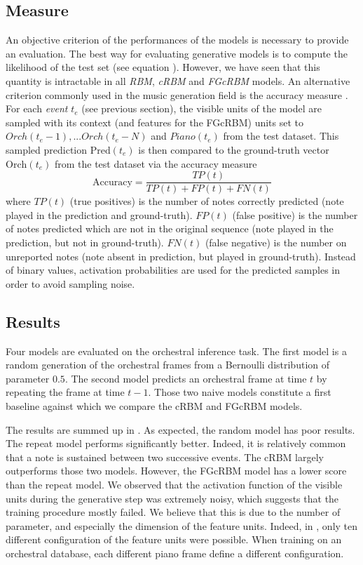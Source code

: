 \documentclass{article}
\begin{document}
\subsection{Measure}
An objective criterion of the performances of the models is necessary to provide an evaluation. 
The best way for evaluating generative models is to compute the likelihood of the test set (see equation ). However, we have seen that this quantity is intractable in all \textit{RBM}, \textit{cRBM} and \textit{FGcRBM} models. 
An alternative criterion commonly used in the music generation field is the accuracy measure \cite{DBLP:journals/corr/YaoCVDD15,boulanger2012modeling,lavrenko2003polyphonic}. For each \textit{event} $t_{e}$ (see previous section), the visible units of the model are sampled with its context (and features for the FGcRBM) units set to $Orch(t_{e}-1),... Orch(t_{e}-N)$ and $Piano(t_{e})$ from the test dataset. This sampled prediction $\text{Pred}(t_{e})$ is then compared to the ground-truth vector $\text{Orch}(t_{e})$ from the test dataset via the accuracy measure
\begin{equation}
\text{Accuracy}  = \frac{TP(t)}{TP(t) + FP(t) + FN(t)}
\label{eq:accuracy}
\end{equation}
where $TP(t)$ (true positives) is the number of notes correctly predicted (note played in the prediction and ground-truth). $FP(t)$ (false positive) is the number of notes predicted which are not in the original sequence (note played in the prediction, but not in ground-truth). $FN(t)$ (false negative) is the number on unreported notes (note absent in prediction, but played in ground-truth). 
Instead of binary values, activation probabilities are used for the predicted samples in order to avoid sampling noise.

\subsection{Results}
Four models are evaluated on the orchestral inference task. The first model is a random generation of the orchestral frames from a Bernoulli distribution of parameter $0.5$. The second model predicts an orchestral frame at time $t$ by repeating the frame at time $t-1$. Those two naive models constitute a first baseline against which we compare the cRBM and FGcRBM models.

The results are summed up in . As expected, the random model has poor results. The repeat model performs significantly better. Indeed, it is relatively common that a note is sustained between two successive events. The cRBM largely outperforms those two models. However, the FGcRBM model has a lower score than the repeat model. We observed that the activation function of the visible units during the generative step was extremely noisy, which suggests that the training procedure mostly failed. We believe that this is due to the number of parameter,  and especially the dimension of the feature units. Indeed, in \cite{taylor2009factored}, only ten different configuration of the feature units were possible. When training on an orchestral database,  each different piano frame define a different configuration.
\end{document}
